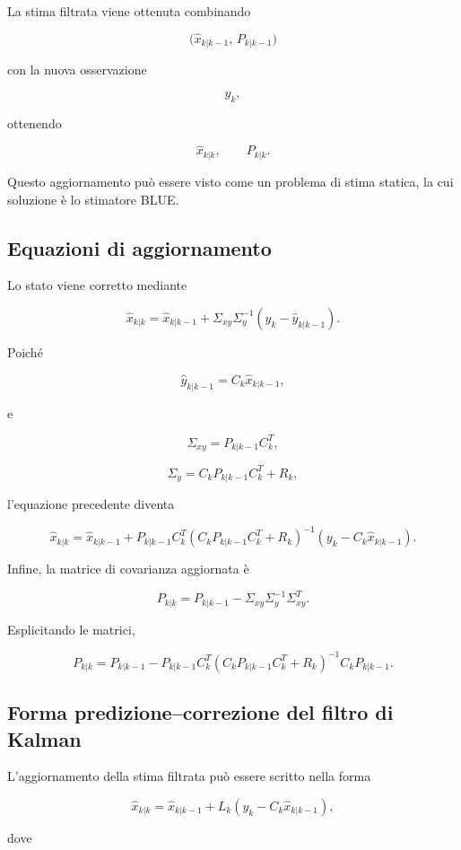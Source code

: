 \documentclass[11pt,a4paper]{article}
\begin{document}
La stima filtrata viene ottenuta combinando

\[
\bigl(\hat{x}_{k|k-1},\,P_{k|k-1}\bigr)
\]

con la nuova osservazione

\[
y_k,
\]

ottenendo

\[
\boxed{
\hat{x}_{k|k},
\qquad
P_{k|k}.
}
\]

Questo aggiornamento può essere visto come un problema di stima statica, la cui soluzione è lo stimatore BLUE.

\subsection*{Equazioni di aggiornamento}

Lo stato viene corretto mediante

\[
\boxed{
\hat{x}_{k|k}
=
\hat{x}_{k|k-1}
+
\Sigma_{xy}\Sigma_y^{-1}
\left(
y_k-\hat{y}_{k|k-1}
\right).
}
\]

Poiché

\[
\hat{y}_{k|k-1}
=
C_k\hat{x}_{k|k-1},
\]

e

\[
\Sigma_{xy}
=
P_{k|k-1}C_k^T,
\]

\[
\Sigma_y
=
C_kP_{k|k-1}C_k^T
+
R_k,
\]

l'equazione precedente diventa

\[
\boxed{
\hat{x}_{k|k}
=
\hat{x}_{k|k-1}
+
P_{k|k-1}C_k^T
\left(
C_kP_{k|k-1}C_k^T
+
R_k
\right)^{-1}
\left(
y_k-C_k\hat{x}_{k|k-1}
\right).
}
\]

Infine, la matrice di covarianza aggiornata è

\[
\boxed{
P_{k|k}
=
P_{k|k-1}
-
\Sigma_{xy}
\Sigma_y^{-1}
\Sigma_{xy}^T.
}
\]

Esplicitando le matrici,

\[
\boxed{
P_{k|k}
=
P_{k|k-1}
-
P_{k|k-1}C_k^T
\left(
C_kP_{k|k-1}C_k^T
+
R_k
\right)^{-1}
C_kP_{k|k-1}.
}
\]

\subsection*{Forma predizione--correzione del filtro di Kalman}

L'aggiornamento della stima filtrata può essere scritto nella forma

\[
\boxed{
\hat{x}_{k|k}
=
\hat{x}_{k|k-1}
+
L_k
\left(
y_k-C_k\hat{x}_{k|k-1}
\right),
}
\]

dove
\end{document}
